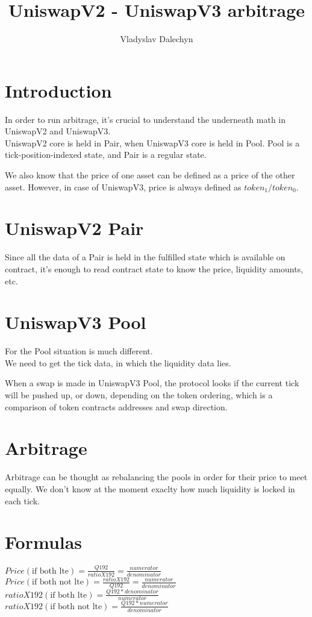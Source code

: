 \documentclass{article}
\title{UniswapV2 - UniswapV3 arbitrage}
\author{Vladyslav Dalechyn}
\begin{document}
\maketitle


\section{Introduction}
    In order to run arbitrage, it's crucial to understand the underneath math in UniswapV2 and UniswapV3.\\

    UniswapV2 core is held in Pair, when UniswapV3 core is held in Pool.
    Pool is a tick-position-indexed state, and Pair is a regular state.

    We also know that the price of one asset can be defined as a price of the other asset.
    However, in case of UniswapV3, price is always defined as $token_1/token_0$.

\section{UniswapV2 Pair}
    Since all the data of a Pair is held in the fulfilled state which is available on contract,
    it's enough to read contract state to know the price, liquidity amounts, etc.

\section{UniswapV3 Pool}
    For the Pool situation is much different.\\
    We need to get the tick data, in which the liquidity data lies.

    When a swap is made in UniswapV3 Pool, the protocol looks if the current tick will be pushed
    up, or down, depending on the token ordering, which is a comparison of token contracts addresses and swap direction.

\section{Arbitrage}
    Arbitrage can be thought as rebalancing the pools in order for their price to meet equally.
    We don't know at the moment exaclty how much liquidity is locked in each tick.

\section{Formulas}
    $Price (\text{if both lte})= \frac{Q192}{ratioX192} = \frac{numerator}{denominator}$\\
    $Price (\text{if both not lte})= \frac{ratioX192}{Q192} = \frac{numerator}{denominator}$\\
    $ratioX192 (\text{if both lte})= \frac{Q192 * denominator}{numerator} $\\
    $ratioX192 (\text{if both not lte})= \frac{Q192 * numerator}{denominator} $\\
\end{document}

